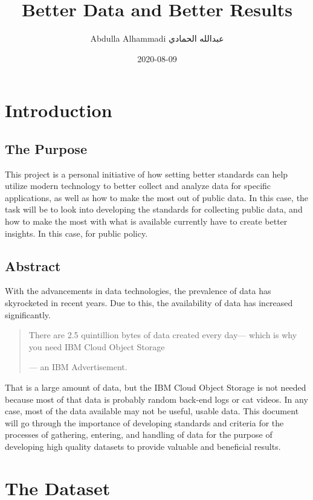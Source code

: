 \documentclass[
]{book}
\title{Better Data and Better Results}
\author{Abdulla Alhammadi \textbar{} عبدالله الحمادي}
\date{2020-08-09}
\begin{document}
\maketitle

{
\setcounter{tocdepth}{1}
\tableofcontents
}
\hypertarget{intro}{%
\chapter{Introduction}\label{intro}}

\hypertarget{the-purpose}{%
\section{The Purpose}\label{the-purpose}}

This project is a personal initiative of how setting better standards can help utilize modern technology to better collect and analyze data for specific applications, as well as how to make the most out of public data. In this case, the task will be to look into developing the standards for collecting public data, and how to make the most with what is available currently have to create better insights. In this case, for public policy.

\hypertarget{abstract}{%
\section{Abstract}\label{abstract}}

With the advancements in data technologies, the prevalence of data has skyrocketed in recent years. Due to this, the availability of data has increased significantly.

\begin{quote}
There are 2.5 quintillion bytes of data created every day---
which is why you need IBM Cloud Object Storage

--- an IBM Advertisement.
\end{quote}

That is a large amount of data, but the IBM Cloud Object Storage is not needed because most of that data is probably random back-end logs or cat videos. In any case, most of the data available may not be useful, usable data. This document will go through the importance of developing standards and criteria for the processes of gathering, entering, and handling of data for the purpose of developing high quality datasets to provide valuable and beneficial results.

\hypertarget{the-dataset}{%
\chapter{The Dataset}\label{the-dataset}}
\end{document}
